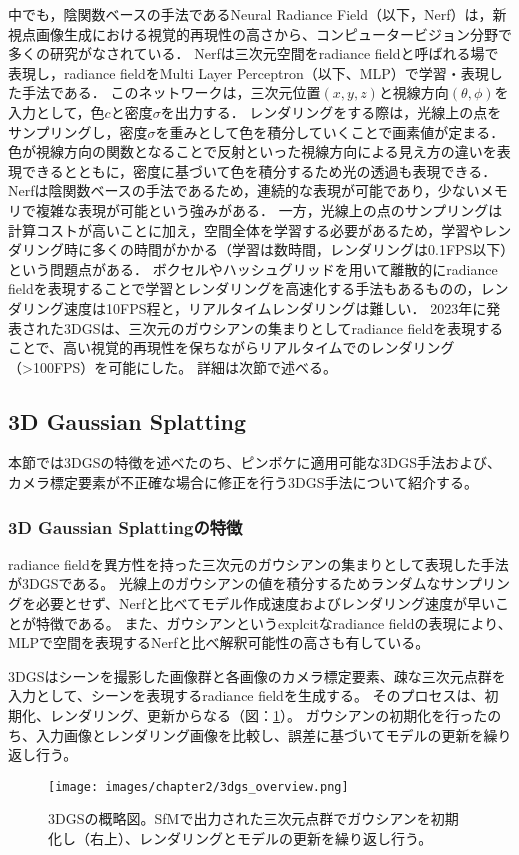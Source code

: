 中でも，陰関数ベースの手法であるNeural Radiance Field（以下，Nerf）\cite{nerf}は，新視点画像生成における視覚的再現性の高さから、コンピュータービジョン分野で多くの研究がなされている．
Nerfは三次元空間をradiance fieldと呼ばれる場で表現し，radiance fieldをMulti Layer Perceptron（以下、MLP）で学習・表現した手法である．
このネットワークは，三次元位置$(x,y,z)$と視線方向$(\theta, \phi)$を入力として，色$c$と密度$\sigma$を出力する．
レンダリングをする際は，光線上の点をサンプリングし，密度$\sigma$を重みとして色を積分していくことで画素値が定まる．
色が視線方向の関数となることで反射といった視線方向による見え方の違いを表現できるとともに，密度に基づいて色を積分するため光の透過も表現できる．
Nerfは陰関数ベースの手法であるため，連続的な表現が可能であり，少ないメモリで複雑な表現が可能という強みがある．
一方，光線上の点のサンプリングは計算コストが高いことに加え，空間全体を学習する必要があるため，学習やレンダリング時に多くの時間がかかる（学習は数時間，レンダリングは0.1FPS以下）という問題点がある\cite{3dgs}．
ボクセルやハッシュグリッドを用いて離散的にradiance fieldを表現することで学習とレンダリングを高速化する手法もある\cite{plenoxels}\cite{instant-ngp}ものの，レンダリング速度は10FPS程と，リアルタイムレンダリングは難しい．
2023年に発表された3DGS\cite{3dgs}は、三次元のガウシアンの集まりとしてradiance fieldを表現することで、高い視覚的再現性を保ちながらリアルタイムでのレンダリング（>100FPS）を可能にした。
詳細は次節で述べる。

\subsection{3D Gaussian Splatting}\label{subsec:3dgs_researches} 
本節では3DGSの特徴を述べたのち、ピンボケに適用可能な3DGS手法および、カメラ標定要素が不正確な場合に修正を行う3DGS手法について紹介する。

\subsubsection{3D Gaussian Splattingの特徴}\label{subsubsec:feature_of_3dgs}
radiance fieldを異方性を持った三次元のガウシアンの集まりとして表現した手法が3DGS\cite{3dgs}である。
光線上のガウシアンの値を積分するためランダムなサンプリングを必要とせず、Nerfと比べてモデル作成速度およびレンダリング速度が早いことが特徴である。
また、ガウシアンというexplcitなradiance fieldの表現により、MLPで空間を表現するNerfと比べ解釈可能性の高さも有している。\par

3DGSはシーンを撮影した画像群と各画像のカメラ標定要素、疎な三次元点群を入力として、シーンを表現するradiance fieldを生成する。
そのプロセスは、初期化、レンダリング、更新からなる（図：\ref{fig:3dgs_overview}）。
ガウシアンの初期化を行ったのち、入力画像とレンダリング画像を比較し、誤差に基づいてモデルの更新を繰り返し行う。
\begin{figure}[h]
  \centering
  \texttt{[image: images/chapter2/3dgs\_overview.png]}
  \caption[3DGSの概略図]{3DGSの概略図。SfMで出力された三次元点群でガウシアンを初期化し（右上）、レンダリングとモデルの更新を繰り返し行う。}
  \label{fig:3dgs_overview}
\end{figure}

